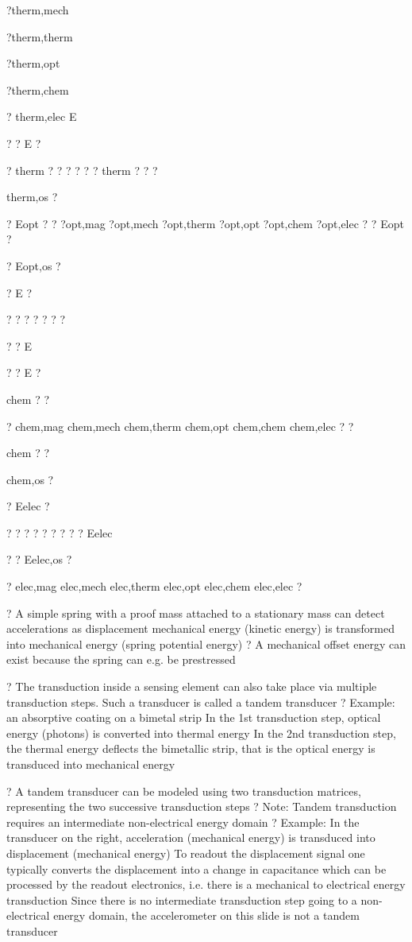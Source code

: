 \documentclass[2pt,landscape]{article}
\begin{document}
\begin{multicols*}{5}
?therm,mech


?therm,therm


?therm,opt


?therm,chem


?
therm,elec	E


?	? E	?


?	therm ? ? ?	? ? ?	therm ? ? ?


therm,os ?


? Eopt   ?	? ?opt,mag	?opt,mech	?opt,therm	?opt,opt	?opt,chem	?opt,elec   ? ? Eopt   ?


? Eopt,os   ?


? E	?


?
?	?	?	?	?	?


? ? E


?	? E	?


chem
?	?


?	chem,mag	chem,mech	chem,therm	chem,opt	chem,chem	chem,elec ?
?


chem
?	?


chem,os
?


? Eelec ?


? ?	?	?	?	?	?	? ? Eelec


?	? Eelec,os ?


?	elec,mag	elec,mech	elec,therm	elec,opt	elec,chem	elec,elec ?

?	A simple spring with a proof mass attached 
to a stationary mass can detect 
accelerations as displacement
mechanical energy (kinetic energy)
is transformed into mechanical energy 
(spring potential energy)
?	A mechanical offset energy can exist 
because the spring can e.g. be prestressed



?	The transduction inside a sensing element can also take place via 
multiple transduction steps. Such a transducer is called a tandem 
transducer
?	Example: an absorptive coating on a bimetal strip
\textbullet 	In the 1st transduction step, optical energy (photons) is converted into 
thermal energy
\textbullet 	In the 2nd transduction step, the thermal energy deflects the bimetallic strip, 
that is the optical energy is transduced into mechanical energy













?	A tandem transducer can be modeled using two transduction matrices, 
representing the two successive transduction steps
?	Note: Tandem transduction requires an intermediate non-electrical 
energy domain
?	Example:
\textbullet 	In the transducer on the right, acceleration 
(mechanical energy) is transduced into 
displacement (mechanical energy)
\textbullet 	To readout the displacement signal 
one typically converts the displacement 
into a change in capacitance which can 
be processed by the readout 
electronics, i.e. there is a mechanical 
to electrical energy transduction
Since there is no intermediate transduction step
going to a non-electrical energy domain, the accelerometer on this slide is
not a tandem transducer




\end{multicols*}
\end{document}
